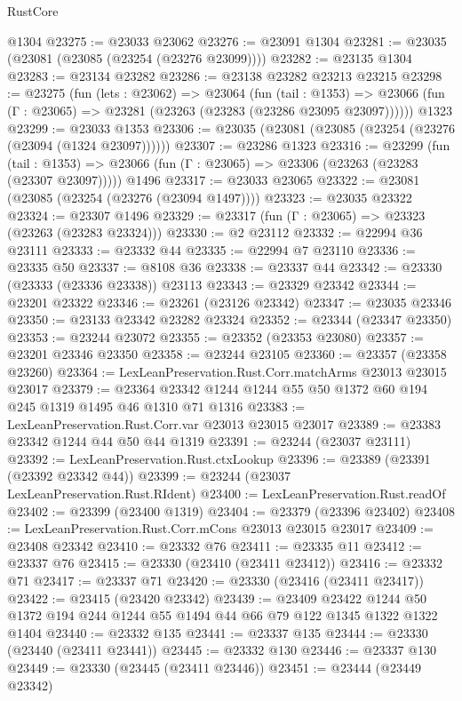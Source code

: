 \begin{lexlean}{RustCore}
\begin{coremodule}
    @1304
@23275 := @23033 @23062
@23276 := @23091 @1304
@23281 := @23035 (@23081 (@23085 (@23254 (@23276 @23099))))
@23282 := @23135 @1304
@23283 := @23134 @23282
@23286 := @23138 @23282 @23213 @23215
@23298 := @23275
    (fun (lets : @23062) =>
    @23064
      (fun (tail : @1353) =>
      @23066 (fun (Γ : @23065) => @23281 (@23263 (@23283 (@23286 @23095 @23097))))))
    @1323
@23299 := @23033 @1353
@23306 := @23035 (@23081 (@23085 (@23254 (@23276 (@23094 (@1324 @23097))))))
@23307 := @23286 @1323
@23316 := @23299
    (fun (tail : @1353) => @23066 (fun (Γ : @23065) => @23306 (@23263 (@23283 (@23307 @23097)))))
    @1496
@23317 := @23033 @23065
@23322 := @23081 (@23085 (@23254 (@23276 (@23094 @1497))))
@23323 := @23035 @23322
@23324 := @23307 @1496
@23329 := @23317 (fun (Γ : @23065) => @23323 (@23263 (@23283 @23324)))
@23330 := @2 @23112
@23332 := @22994 @36 @23111
@23333 := @23332 @44
@23335 := @22994 @7 @23110
@23336 := @23335 @50
@23337 := @8108 @36
@23338 := @23337 @44
@23342 := @23330 (@23333 (@23336 @23338)) @23113
@23343 := @23329 @23342
@23344 := @23201 @23322
@23346 := @23261 (@23126 @23342)
@23347 := @23035 @23346
@23350 := @23133 @23342 @23282 @23324
@23352 := @23344 (@23347 @23350)
@23353 := @23244 @23072
@23355 := @23352 (@23353 @23080)
@23357 := @23201 @23346 @23350
@23358 := @23244 @23105
@23360 := @23357 (@23358 @23260)
@23364 := LexLeanPreservation.Rust.Corr.matchArms @23013 @23015 @23017
@23379 := @23364 @23342 @1244 @1244 @55 @50 @1372 @60 @194 @245 @1319 @1495 @46 @1310 @71 @1316
@23383 := LexLeanPreservation.Rust.Corr.var @23013 @23015 @23017
@23389 := @23383 @23342 @1244 @44 @50 @44 @1319
@23391 := @23244 (@23037 @23111)
@23392 := LexLeanPreservation.Rust.ctxLookup
@23396 := @23389 (@23391 (@23392 @23342 @44))
@23399 := @23244 (@23037 LexLeanPreservation.Rust.RIdent)
@23400 := LexLeanPreservation.Rust.readOf
@23402 := @23399 (@23400 @1319)
@23404 := @23379 (@23396 @23402)
@23408 := LexLeanPreservation.Rust.Corr.mCons @23013 @23015 @23017
@23409 := @23408 @23342
@23410 := @23332 @76
@23411 := @23335 @11
@23412 := @23337 @76
@23415 := @23330 (@23410 (@23411 @23412))
@23416 := @23332 @71
@23417 := @23337 @71
@23420 := @23330 (@23416 (@23411 @23417))
@23422 := @23415 (@23420 @23342)
@23439 := @23409
    @23422
    @1244
    @50
    @1372
    @194
    @244
    @1244
    @55
    @1494
    @44
    @66
    @79
    @122
    @1345
    @1322
    @1322
    @1404
@23440 := @23332 @135
@23441 := @23337 @135
@23444 := @23330 (@23440 (@23411 @23441))
@23445 := @23332 @130
@23446 := @23337 @130
@23449 := @23330 (@23445 (@23411 @23446))
@23451 := @23444 (@23449 @23342)

\end{coremodule}
\end{lexlean}
